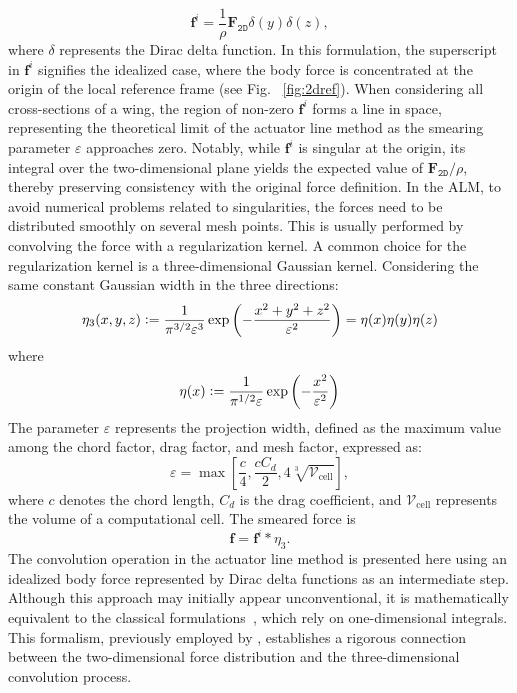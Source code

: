 \documentclass[11pt,a4paper]{article}
\newcommand{\defeq}{\vcentcolon=}
\begin{document}
%
\begin{equation}
\label{eq:f2d}
\boldsymbol{f}^i = \frac{1}{\rho} \boldsymbol{\text{F}}_{\texttt{2D}} \delta(y) \delta(z),
\end{equation}
%
where $\delta$ represents the Dirac delta function. In this formulation, the superscript in $\boldsymbol{f}^i$ signifies the idealized case, where the body force is concentrated at the origin of the local reference frame (see Fig. ~\ref{fig:2dref}). 
%
When considering all cross-sections of a wing, the region of non-zero $\boldsymbol{f}^i$ forms a line in space, representing the theoretical limit of the actuator line method as the smearing parameter $\varepsilon$ approaches zero. Notably, while $\boldsymbol{f}^i$ is singular at the origin, its integral over the two-dimensional plane yields the expected value of $\boldsymbol{F}_{\texttt{2D}}/\rho$, thereby preserving consistency with the original force definition.
%
In the ALM, to avoid numerical problems related to singularities, the forces need to be distributed smoothly on several mesh points. This is usually performed by convolving the force with a regularization kernel. A common choice for the regularization kernel is a three-dimensional Gaussian kernel.  Considering the same constant Gaussian width in the three directions:
\begin{equation}
\label{eq:eta3d}
\eta_3(x,y,z) \defeq \frac{1}{\pi^{3/2}\varepsilon^3} \exp{\left(-\frac{x^2+y^2+z^2}{\varepsilon^2}\right)}=\eta(x)\eta(y)\eta(z)
\end{equation}
where
\begin{equation}
\eta(x) \defeq \frac{1}{\pi^{1/2}\varepsilon} \exp{\left(-\frac{x^2}{\varepsilon^2}\right)}
\end{equation}
The parameter $\varepsilon$ represents the projection width, defined as the maximum value among the chord factor, drag factor, and mesh factor, expressed as:
\[
\varepsilon = \max \left[\frac{c}{4}, \frac{c C_{d}}{2}, 4 \sqrt[3]{\mathcal{V}_{\text{cell}}}\right],
\]
where $c$ denotes the chord length, $C_{d}$ is the drag coefficient, and $\mathcal{V}_{\text{cell}}$ represents the volume of a computational cell. The smeared force is
\begin{equation}
\boldsymbol{f} = \boldsymbol{f}^i * \eta_3 .
\label{eq:fconvoluted}
\end{equation}
%
The convolution operation in the actuator line method is presented here using an idealized body force represented by Dirac delta functions as an intermediate step. Although this approach may initially appear unconventional, it is mathematically equivalent to the classical formulations~\citep{sorensen2002numerical, mikkelsen2003actuator}, which rely on one-dimensional integrals. This formalism, previously employed by \cite{martinez2019filtered}, establishes a rigorous connection between the two-dimensional force distribution and the three-dimensional convolution process.
\end{document}
